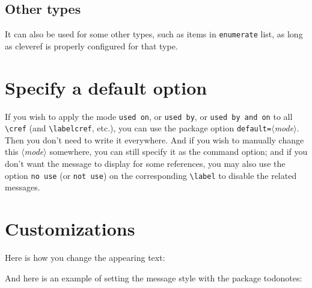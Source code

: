 \documentclass[
    title in boldface,
    emphasize theorems,
    simple name, %
    name in link,
]{einfart}
\newcommand{\meta}[1]{$\langle${\normalfont\itshape#1}$\rangle$}
\newcommand{\packageoption}[1]{\textcolor{code-option}{\texttt{#1}}}
\newcommand{\commandoption}[1]{\textcolor{code-keys}{\texttt{#1}}}
\begin{document}
\subsection{Other types}

It can also be used for some other types, such as items in \texttt{enumerate} list, as long as \textsf{cleveref} is properly configured for that type.

\section{Specify a default option}

If you wish to apply the mode \commandoption{used on}, or \commandoption{used by}, or \commandoption{used by and on} to all \lstinline|\cref| (and \lstinline|\labelcref|, etc.), you can use the package option \packageoption{default=}\meta{mode}. Then you don't need to write it everywhere. And if you wish to manually change this \meta{mode} somewhere, you can still specify it as the command option; and if you don't want the message to display for some references, you may also use the option \commandoption{no use} (or \commandoption{not use}) on the corresponding \lstinline|\label| to disable the related messages.


\section{Customizations}

\begingroup

Here is how you change the appearing text:

\begin{code}
\end{code}


\bigskip
And here is an example of setting the message style with the package \textsf{todonotes}:

\begin{code}
\SetForwardReferenceStyle
  {%
  }
\SetForwardReferenceStyleOutsideMath
  {%
  }
\end{code}
\end{document}
